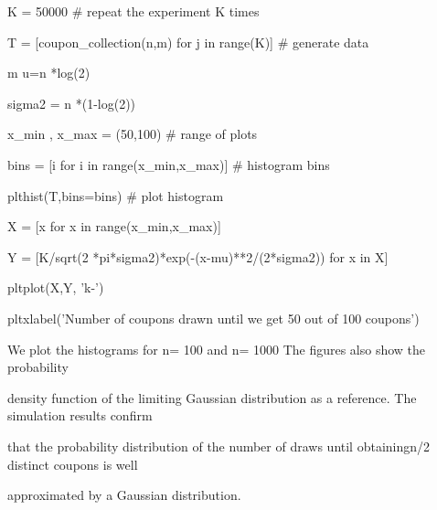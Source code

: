 K = 50000 # repeat the experiment K times

T = [coupon_collection(n,m) for j in range(K)] # generate data

m u=n *log(2)

sigma2 = n *(1-log(2))

x_min , x_max = (50,100) # range of plots

bins = [i for i in range(x_min,x_max)] # histogram bins

plthist(T,bins=bins) # plot histogram

X = [x for x in range(x_min,x_max)]

Y = [K/sqrt(2 *pi*sigma2)*exp(-(x-mu)**2/(2*sigma2)) for x in X]

pltplot(X,Y, 'k-')

pltxlabel('Number of coupons drawn until we get 50 out of 100 coupons')

We plot the histograms for n= 100 and n= 1000 The figures also show the probability

density function of the limiting Gaussian distribution as a reference. The simulation results confirm

that the probability distribution of the number of draws until obtainingn/2 distinct coupons is well

approximated by a Gaussian distribution.
